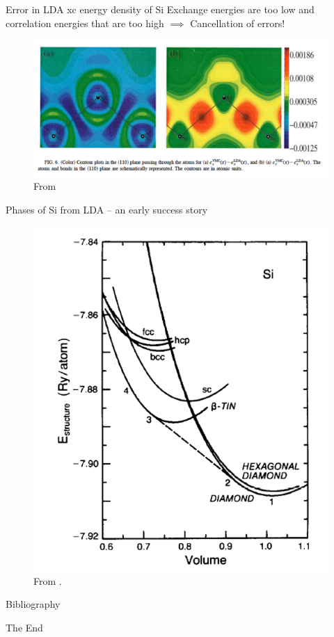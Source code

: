 \documentclass[aspectratio=169]{beamer}
\begin{document}
    \begin{frame}{Error in LDA xc energy density of Si}
        Exchange energies are too low and correlation energies that are too high $\implies$ Cancellation of errors!
        \begin{figure}
            \centering
            \includegraphics[width=0.7\linewidth]{lectures/figures/5_xc_energies_Si.png}
            \caption{From \cite{hoodExchangeCorrelationSilicon1998}}
        \end{figure}

    \end{frame}

    \begin{frame}{Phases of Si from LDA – an early success story}
        \begin{figure}
            \centering
            \includegraphics[width=0.35\linewidth]{lectures/figures/5_phase_diagram_si.png}
            \caption{From \cite{yinTheoryStaticStructural1982}.}
            \label{fig:enter-label}
        \end{figure}
    \end{frame}

    \begin{frame}[allowframebreaks]{Bibliography}
        
        
    \end{frame}

    \begin{frame}
        \Huge{\centerline{The End}}
    \end{frame}
\end{document}
